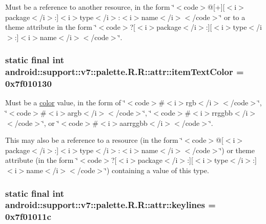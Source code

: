 Must be a reference to another resource, in the form \char`\"{}$<$code$>$@\mbox{[}+\mbox{]}\mbox{[}$<$i$>$package$<$/i$>$:\mbox{]}$<$i$>$type$<$/i$>$:$<$i$>$name$<$/i$>$$<$/code$>$\char`\"{} or to a theme attribute in the form \char`\"{}$<$code$>$?\mbox{[}$<$i$>$package$<$/i$>$:\mbox{]}\mbox{[}$<$i$>$type$<$/i$>$:\mbox{]}$<$i$>$name$<$/i$>$$<$/code$>$\char`\"{}. \hypertarget{classandroid_1_1support_1_1v7_1_1palette_1_1_r_1_1attr_86d6ff3eefb08f00a58d1d680f2ff90d}{
\subsubsection[{itemTextColor}]{\setlength{\rightskip}{0pt plus 5cm}static final int android::support::v7::palette.R.R::attr::itemTextColor = 0x7f010130}}
\label{classandroid_1_1support_1_1v7_1_1palette_1_1_r_1_1attr_86d6ff3eefb08f00a58d1d680f2ff90d}


Must be a \hyperlink{classandroid_1_1support_1_1v7_1_1palette_1_1_r_1_1color}{color} value, in the form of \char`\"{}$<$code$>$\#$<$i$>$rgb$<$/i$>$$<$/code$>$\char`\"{}, \char`\"{}$<$code$>$\#$<$i$>$argb$<$/i$>$$<$/code$>$\char`\"{}, \char`\"{}$<$code$>$\#$<$i$>$rrggbb$<$/i$>$$<$/code$>$\char`\"{}, or \char`\"{}$<$code$>$\#$<$i$>$aarrggbb$<$/i$>$$<$/code$>$\char`\"{}. 

This may also be a reference to a resource (in the form \char`\"{}$<$code$>$@\mbox{[}$<$i$>$package$<$/i$>$:\mbox{]}$<$i$>$type$<$/i$>$:$<$i$>$name$<$/i$>$$<$/code$>$\char`\"{}) or theme attribute (in the form \char`\"{}$<$code$>$?\mbox{[}$<$i$>$package$<$/i$>$:\mbox{]}\mbox{[}$<$i$>$type$<$/i$>$:\mbox{]}$<$i$>$name$<$/i$>$$<$/code$>$\char`\"{}) containing a value of this type. \hypertarget{classandroid_1_1support_1_1v7_1_1palette_1_1_r_1_1attr_183635d6d52af67a1f4a9376313a5d40}{
\subsubsection[{keylines}]{\setlength{\rightskip}{0pt plus 5cm}static final int android::support::v7::palette.R.R::attr::keylines = 0x7f01011c}}
\label{classandroid_1_1support_1_1v7_1_1palette_1_1_r_1_1attr_183635d6d52af67a1f4a9376313a5d40}


